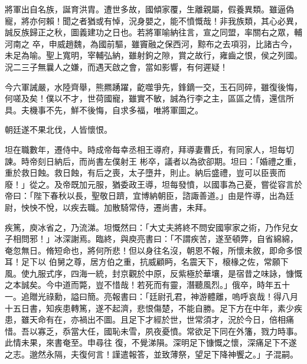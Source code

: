 \begin{pinyinscope}
 將軍出自名族，誕育洪胄。遭世多故，國傾家覆，生離親屬，假養異類。雖逼偽寵，將亦何賴！聞之者猶或有悼，況身嬰之，能不憤慨哉！非我族類，其心必異，誠反族歸正之秋，圖義建功之日也。若將軍喻納往言，宣之同盟，率關右之眾，輔河南之
 卒，申威趙魏，為國前驅，雖竇融之保西河，黥布之去項羽，比諸古今，未足為喻。聖上寬明，宰輔弘納，雖射鉤之隙，賞之故行，雍齒之恨，侯之列國。況二三子無曩人之嫌，而遇天啟之會，當如影響，有何遲疑！



 今六軍誡嚴，水陸齊舉，熊羆踴躍，齕噬爭先，鋒鏑一交，玉石同碎，雖復後悔，何嗟及矣！僕以不才，世荷國寵，雖實不敏，誠為行李之主，區區之情，還信所具。夫機事不先，鮮不後悔，自求多福，唯將軍圖之。



 朝廷遂不果北伐，人皆懷恨。



 坦在職數年，遷侍中。時成帝每幸丞相王導府，拜導妻曹氏，有同家人，坦每切諫。時帝刻日納后，而尚書左僕射王
 彬卒，議者以為欲卻期。坦曰：「婚禮之重，重於救日蝕。救日蝕，有后之喪，太子墮井，則止。納后盛禮，豈可以臣喪而廢！」從之。及帝既加元服，猶委政王導，坦每發憤，以國事為己憂，嘗從容言於帝曰：「陛下春秋以長，聖敬日躋，宜博納朝臣，諮諏善道。」由是忤導，出為廷尉，怏怏不悅，以疾去職。加散騎常侍，遷尚書，未拜。



 疾篤，庾冰省之，乃流涕。坦慨然曰：「大丈夫將終不問安國寧家之術，乃作兒女子相問邪！」冰深謝焉。臨終，與庾亮書曰：「不謂疾苦，遂至頓弊，自省綿綿，奄忽無日。脩短命也，將何所悲！但以身往名沒，朝恩不報，所懷未敘，即命多恨耳！足下以
 伯舅之尊，居方伯之重，抗威顧眄，名震天下，榱椽之佐，常願下風。使九服式序，四海一統，封京觀於中原，反紫極於華壤，是宿昔之味詠，慷慨之本誠矣。今中道而斃，豈不惜哉！若死而有靈，潛聽風烈。」俄卒，時年五十一。追贈光祿勳，謚曰簡。亮報書曰：「廷尉孔君，神游體離，嗚呼哀哉！得八月十五日書，知疾患轉篤，遂不起濟，悲恨傷楚，不能自勝。足下方在中年，素少疾患，雖天命有在，亦禍出不圖。且足下才經於世，世常須才，況於今日，倍相痛惜。吾以寡乏，忝當大任，國恥未雪，夙夜憂憤。常欲足下同在外籓，戮力時事。此情未果，來書奄至。申尋往
 復，不覺涕隕。深明足下慷慨之懷，深痛足下不遂之志。邈然永隔，夫復何言！謹遣報答，並致薄祭，望足下降神饗之。」子混嗣。




\end{pinyinscope}
